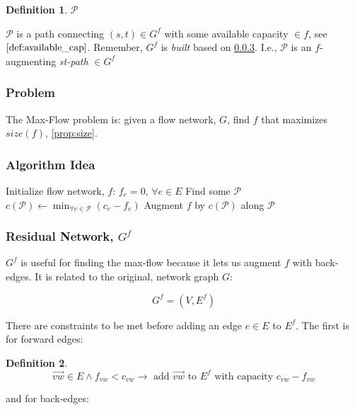 \documentclass{article}
\theoremstyle{definition}
\newtheorem{definition}{Definition}[section]
\begin{document}
\begin{definition}{$\mathcal{P}$}
\label{prop:cal_p}	

	$\mathcal{P}$ is a path connecting $(s,t) \in G^f$ with some available capacity $\in f$,  see $\ref{def:available_cap}$. Remember, $G^f$ is \textit{built} based on \ref{residual_net}. I.e., $\mathcal{P}$ is an $f$-augmenting \textit{st-path} $\in G^f$
\end{definition}

\subsubsection{Problem}
The Max-Flow problem is: given a flow network, $G$, find $f$ that maximizes $size(f)$, \ref{prop:size}.

\subsubsection{Algorithm Idea}
\begin{algorithm}
\caption{$NaiveMaxFlow$}
\label{alg:naive_max_flow}
\begin{algorithmic}[1]
	\STATE Initialize flow network, $f$: $f_e = 0, \, \forall e \in E$
	\STATE Find some $\mathcal{P}$ 
		\STATE $c(\mathcal{P}) \gets \min_{\forall e \in \mathcal{P}} (c_e-f_e)$
		\STATE Augment $f$ by $c(\mathcal{P})$ along $\mathcal{P}$
	\ENDWHILE
\end{algorithmic}
\end{algorithm}

\subsubsection{Residual Network, $G^f$}
\label{residual_net}
$G^f$ is useful for finding the max-flow because it lets us augment $f$ with back-edges. It is related to the original, network graph $G$:

$$G^f = (V, E^f)$$

There are constraints to be met before adding an edge $e \in E$ to $E^f$. The first is for forward edges:

\begin{definition}
\label{def:add_unsat_2_resid}
$$\overrightarrow{vw} \in E \land f_{vw} < c_{vw} \to \text{ add } \overrightarrow{vw} \text { to } E^f \text { with capacity } c_{vw} - f_{vw}$$
\end{definition}

and for back-edges:
\end{document}
